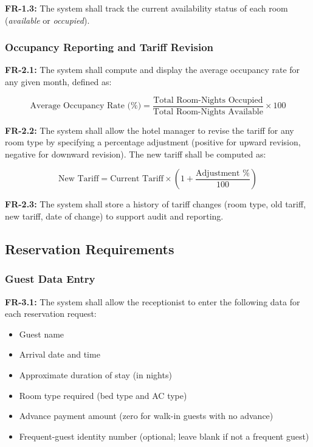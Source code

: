\documentclass[12pt,a4paper]{article}
\newcommand{\req}[2]{%
  \noindent\textbf{\color{medblue}#1:} #2\par\smallskip
}
\begin{document}
\req{FR-1.3}{The system shall track the current availability status of each room
(\textit{available} or \textit{occupied}).}

\subsubsection{Occupancy Reporting and Tariff Revision}

\req{FR-2.1}{The system shall compute and display the average occupancy rate for any
given month, defined as:}
\[
  \text{Average Occupancy Rate (\%)} =
  \frac{\text{Total Room-Nights Occupied}}{\text{Total Room-Nights Available}} \times 100
\]

\req{FR-2.2}{The system shall allow the hotel manager to revise the tariff for any room
type by specifying a percentage adjustment (positive for upward revision, negative for
downward revision). The new tariff shall be computed as:}
\[
  \text{New Tariff} = \text{Current Tariff} \times \left(1 + \frac{\text{Adjustment \%}}{100}\right)
\]

\req{FR-2.3}{The system shall store a history of tariff changes (room type, old tariff,
new tariff, date of change) to support audit and reporting.}

\subsection{Reservation Requirements}

\subsubsection{Guest Data Entry}

\req{FR-3.1}{The system shall allow the receptionist to enter the following data for each
reservation request:}
\begin{itemize}[leftmargin=1.5em]
  \item Guest name
  \item Arrival date and time
  \item Approximate duration of stay (in nights)
  \item Room type required (bed type and AC type)
  \item Advance payment amount (zero for walk-in guests with no advance)
  \item Frequent-guest identity number (optional; leave blank if not a frequent guest)
\end{itemize}
\end{document}
